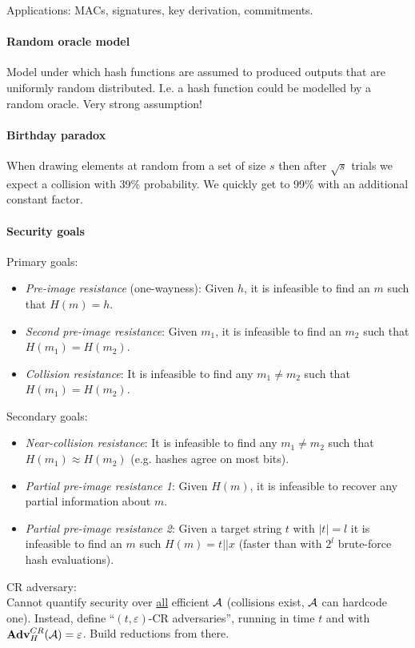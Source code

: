 Applications: MACs, signatures, key derivation, commitments.

\paragraph{Random oracle model}
Model under which hash functions are assumed to produced outputs that are uniformly random distributed.
I.e. a hash function could be modelled by a random oracle.
Very strong assumption!

\paragraph{Birthday paradox}
When drawing elements at random from a set of size $s$ then after $\sqrt{s}$ trials we expect a collision with 39\% probability.
We quickly get to 99\% with an additional constant factor.

\paragraph{Security goals}
Primary goals:
\begin{itemize}
	\item \emph{Pre-image resistance} (one-wayness):
	Given $h$, it is infeasible to find an $m$ such that $H(m) = h$.
	\item \emph{Second pre-image resistance}:
	Given $m_1$, it is infeasible to find an $m_2$ such that $H(m_1) = H(m_2)$.
	\item \emph{Collision resistance}:
	It is infeasible to find any $m_1 \neq m_2$ such that $H(m_1) = H(m_2)$.
\end{itemize}

Secondary goals:
\begin{itemize}
	\item \emph{Near-collision resistance}:
	It is infeasible to find any $m_1 \neq m_2$ such that $H(m_1) \approx H(m_2)$ (e.g. hashes agree on most bits).
	\item \emph{Partial pre-image resistance 1}:
	Given $H(m)$, it is infeasible to recover any partial information about $m$.
	\item \emph{Partial pre-image resistance 2}:
	Given a target string $t$ with $|t|=l$ it is infeasible to find an $m$ such $H(m)=t||x$ (faster than with $2^l$ brute-force hash evaluations).
\end{itemize}

CR adversary:\\
Cannot quantify security over \underline{all} efficient $\mathcal{A}$ (collisions exist, $\mathcal{A}$ can hardcode one).
Instead, define ``$(t, \varepsilon)$-CR adversaries'', running in time $t$ and with $\mathbf{Adv}^{CR}_H(\mathcal{A}) = \varepsilon$.
Build reductions from there.

